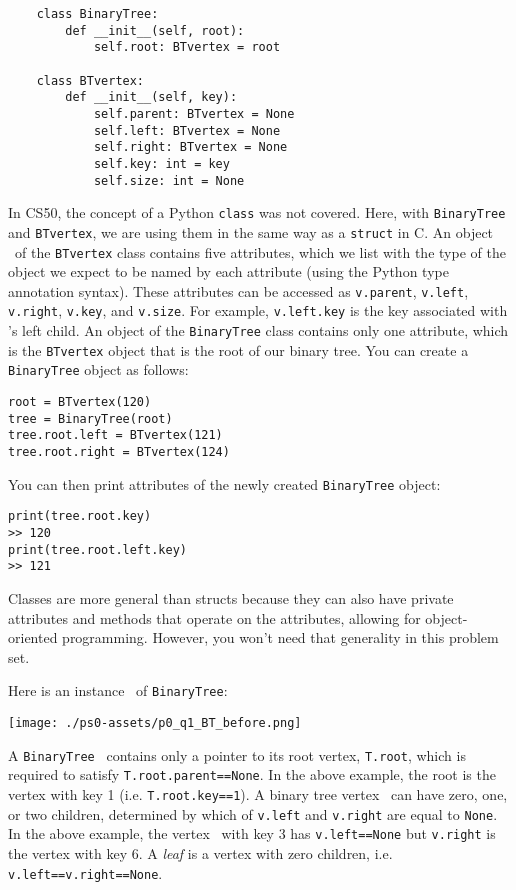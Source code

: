 \documentclass[11pt]{article}
\begin{document}
\begin{enumerate}
 \begin{verbatim}
    class BinaryTree:
        def __init__(self, root):
            self.root: BTvertex = root
 
    class BTvertex:
        def __init__(self, key):
            self.parent: BTvertex = None
            self.left: BTvertex = None
            self.right: BTvertex = None
            self.key: int = key
            self.size: int = None
 \end{verbatim}


 In CS50, the concept of a Python \texttt{class} was not covered. Here, with \texttt{BinaryTree} and \texttt{BTvertex}, we are using them in the same way as a \texttt{struct} in C. An object \btv\ of the \texttt{BTvertex} class contains five attributes, which we list with the type of the object we expect to be named by each attribute (using the Python type annotation syntax). These attributes can be accessed as \texttt{v.parent}, \texttt{v.left}, \texttt{v.right}, \texttt{v.key}, and \texttt{v.size}. 
 For example, \texttt{v.left.key} is the key associated with \btv's left child. An object of the \texttt{BinaryTree} class contains only one attribute, which is the \texttt{BTvertex} object that is the root of our binary tree. You can create a \texttt{BinaryTree} object as follows:
 
\begin{verbatim}
root = BTvertex(120)
tree = BinaryTree(root)
tree.root.left = BTvertex(121)
tree.root.right = BTvertex(124)
\end{verbatim}

You can then print attributes of the newly created \texttt{BinaryTree} object:
\begin{verbatim}
print(tree.root.key)
>> 120
print(tree.root.left.key)
>> 121
\end{verbatim}
 

 Classes are more general than structs because they can also have private attributes and methods that operate on the attributes, allowing for object-oriented programming. However, you won't need that generality in this problem set.

 Here is an instance \treeT\ of \texttt{BinaryTree}:
 
 \texttt{[image: ./ps0-assets/p0\_q1\_BT\_before.png]}

 A \texttt{BinaryTree} \treeT\  contains only a pointer to its root vertex, \texttt{T.root}, which is required to satisfy \texttt{T.root.parent==None}. In the above example, 
 the root is the vertex with key 1 (i.e. \texttt{T.root.key==1}).
 A binary tree vertex \btv\ can have zero, one, or two children, determined by which of \texttt{v.left} and  \texttt{v.right} are equal to \texttt{None}.    In the above example, the vertex \btv\ with key 3 has 
 \texttt{v.left==None} but \texttt{v.right} is the vertex with key 6.
 A {\em leaf} is a vertex with zero children, i.e. \texttt{v.left==v.right==None}. 
 

\end{enumerate}
\end{document}
